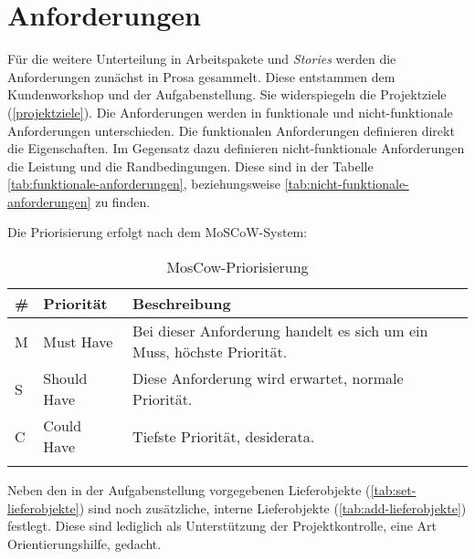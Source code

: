 \section{Anforderungen} \label{sec:anforderungen}

Für die weitere Unterteilung in Arbeitspakete und \textit{Stories} werden die Anforderungen zunächst in Prosa gesammelt. Diese entstammen dem Kundenworkshop und der Aufgabenstellung. Sie widerspiegeln die Projektziele (\autoref{projektziele}). Die Anforderungen werden in funktionale und nicht-funktionale Anforderungen unterschieden. Die funktionalen Anforderungen definieren direkt die Eigenschaften. Im Gegensatz dazu definieren nicht-funktionale Anforderungen die Leistung und die Randbedingungen. Diese sind in der Tabelle \autoref{tab:funktionale-anforderungen}, beziehungsweise \autoref{tab:nicht-funktionale-anforderungen} zu finden.

Die Priorisierung erfolgt nach dem \gls{MoSCoW-System}:

\begin{longtable}{|p{1.5cm} | p{2.5cm} | p{7.2cm}|}
  \hline
    \# & Priorität & Beschreibung \\\hline
    M & Must Have & Bei dieser Anforderung handelt es sich um ein Muss, höchste Priorität.\\\hline
    S & Should Have & Diese Anforderung wird erwartet, normale Priorität.\\\hline
    C & Could Have & Tiefste Priorität, desiderata.\\\hline
    \caption{MosCow-Priorisierung}
  \label{tab:moscow}
\end{longtable}


Neben den in der Aufgabenstellung vorgegebenen Lieferobjekte (\autoref{tab:set-lieferobjekte}) sind noch zusätzliche, interne Lieferobjekte (\autoref{tab:add-lieferobjekte}) festlegt. Diese sind lediglich als Unterstützung der Projektkontrolle, eine Art Orientierungshilfe, gedacht.
